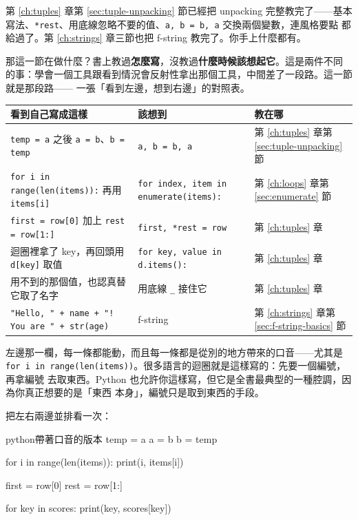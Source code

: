 第 \ref{ch:tuples} 章第 \ref{sec:tuple-unpacking} 節已經把 unpacking 完整教完了——基本
寫法、\texttt{*rest}、用底線忽略不要的值、\texttt{a, b = b, a} 交換兩個變數，連風格要點
都給過了。第 \ref{ch:strings} 章三節也把 f-string 教完了。你手上什麼都有。

那這一節在做什麼？書上教過\textbf{怎麼寫}，沒教過\textbf{什麼時候該想起它}。這是兩件不同
的事：學會一個工具跟看到情況會反射性拿出那個工具，中間差了一段路。這一節就是那段路——
一張「看到左邊，想到右邊」的對照表。

\begin{center}
\begin{tabular}{@{}p{5.4cm}p{5.4cm}p{3.8cm}@{}}
\toprule
看到自己寫成這樣 & 該想到 & 教在哪 \\
\midrule
\texttt{temp = a} 之後 \texttt{a = b}、\texttt{b = temp} &
\texttt{a, b = b, a} &
第 \ref{ch:tuples} 章第 \ref{sec:tuple-unpacking} 節 \\
\addlinespace
\texttt{for i in range(len(items)):} 再用 \texttt{items[i]} &
\texttt{for index, item in enumerate(items):} &
第 \ref{ch:loops} 章第 \ref{sec:enumerate} 節 \\
\addlinespace
\texttt{first = row[0]} 加上 \texttt{rest = row[1:]} &
\texttt{first, *rest = row} &
第 \ref{ch:tuples} 章 \\
\addlinespace
迴圈裡拿了 key，再回頭用 \texttt{d[key]} 取值 &
\texttt{for key, value in d.items():} &
第 \ref{ch:tuples} 章 \\
\addlinespace
用不到的那個值，也認真替它取了名字 &
用底線 \texttt{\_} 接住它 &
第 \ref{ch:tuples} 章 \\
\addlinespace
\texttt{"Hello, " + name + "! You are " + str(age)} &
f-string &
第 \ref{ch:strings} 章第 \ref{sec:f-string-basics} 節 \\
\bottomrule
\end{tabular}
\end{center}

左邊那一欄，每一條都能動，而且每一條都是從別的地方帶來的口音——尤其是
\texttt{for i in range(len(items))}。很多語言的迴圈就是這樣寫的：先要一個編號，再拿編號
去取東西。Python 也允許你這樣寫，但它是全書最典型的一種腔調，因為你真正想要的是「東西
本身」，編號只是取到東西的手段。

把左右兩邊並排看一次：

\begin{code}{python}{帶著口音的版本}
temp = a
a = b
b = temp

for i in range(len(items)):
    print(i, items[i])

first = row[0]
rest = row[1:]

for key in scores:
    print(key, scores[key])
\end{code}

